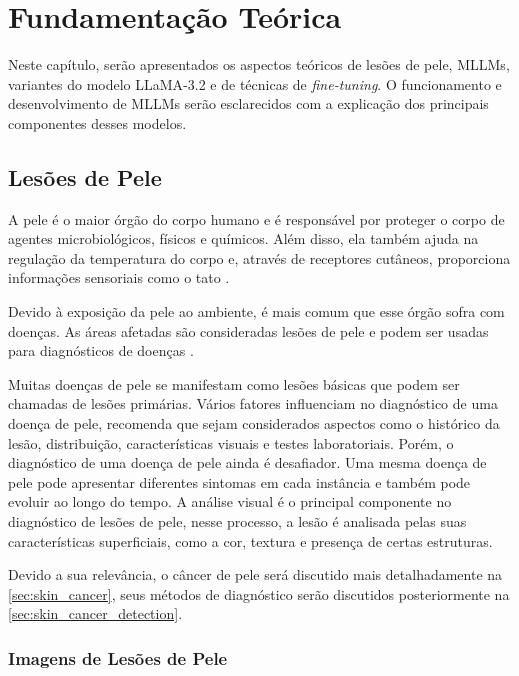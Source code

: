 \chapter{Fundamentação Teórica}

Neste capítulo, serão apresentados os aspectos teóricos de lesões de pele, \acp{MLLM}, variantes do modelo
\ac{LLaMA}-3.2 e de técnicas de \textit{fine-tuning}. O funcionamento e desenvolvimento de \acp{MLLM} serão
esclarecidos com a explicação dos principais componentes desses modelos.

\section{Lesões de Pele}

A pele é o maior órgão do corpo humano e é responsável por proteger o corpo de agentes microbiológicos, físicos e
químicos. Além disso, ela também ajuda na regulação da temperatura do corpo e, através de receptores cutâneos,
proporciona informações sensoriais como o tato \cite{skin}.

Devido à exposição da pele ao ambiente, é mais comum que esse órgão sofra com doenças. As áreas afetadas são
consideradas lesões de pele e podem ser usadas para diagnósticos de doenças \cite{segmentation_skin_lesions}.

Muitas doenças de pele se manifestam como lesões básicas que podem ser chamadas de lesões primárias. Vários fatores
influenciam no diagnóstico de uma doença de pele, \textcite{habif2015clinical} recomenda que sejam considerados
aspectos como o histórico da lesão, distribuição, características visuais e testes laboratoriais. Porém, o diagnóstico
de uma doença de pele ainda é desafiador. Uma mesma doença de pele pode apresentar diferentes sintomas em cada
instância e também pode evoluir ao longo do tempo. A análise visual é o principal componente no diagnóstico de lesões
de pele, nesse processo, a lesão é analisada pelas suas características superficiais, como a cor, textura e presença de
certas estruturas.

Devido a sua relevância, o câncer de pele será discutido mais detalhadamente na \autoref{sec:skin_cancer}, seus métodos
de diagnóstico serão discutidos posteriormente na \autoref{sec:skin_cancer_detection}.

\subsection{Imagens de Lesões de Pele} \label{sec:skin_lesion_images}


